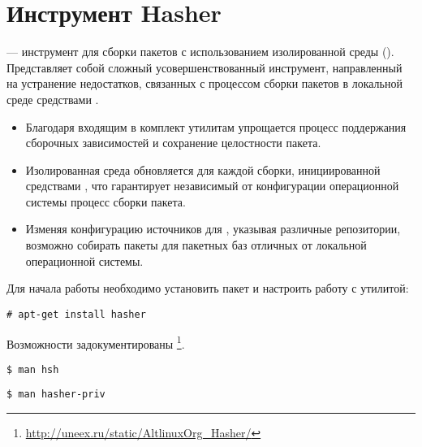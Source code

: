\hypertarget{5}{\chapter{Инструмент Hasher}}
 --- инструмент для сборки пакетов с использованием изолированной среды ().
Представляет собой сложный усовершенствованный инструмент, направленный на устранение недостатков,
связанных с процессом сборки пакетов в локальной среде средствами .
\begin{itemize}
	    \item Благодаря входящим в комплект утилитам упрощается процесс поддержания сборочных зависимостей и сохранение
целостности пакета.
	    \item  Изолированная среда обновляется для каждой сборки, инициированной средствами ,
что гарантирует независимый от конфигурации операционной системы процесс сборки пакета.
	    \item  Изменяя конфигурацию источников для , указывая различные
репозитории, возможно собирать пакеты для пакетных баз отличных от локальной
операционной системы.
\end{itemize}

Для начала работы необходимо установить пакет  и настроить работу с утилитой:
\begin{verbatim}
# apt-get install hasher
\end{verbatim}

Возможности  задокументированы%
\footnote{\href{http://uneex.ru/static/AltlinuxOrg_Hasher/}{http://uneex.ru/static/AltlinuxOrg\_Hasher/}}.
\begin{verbatim}
$ man hsh
\end{verbatim}

\begin{verbatim}
$ man hasher-priv
\end{verbatim}

